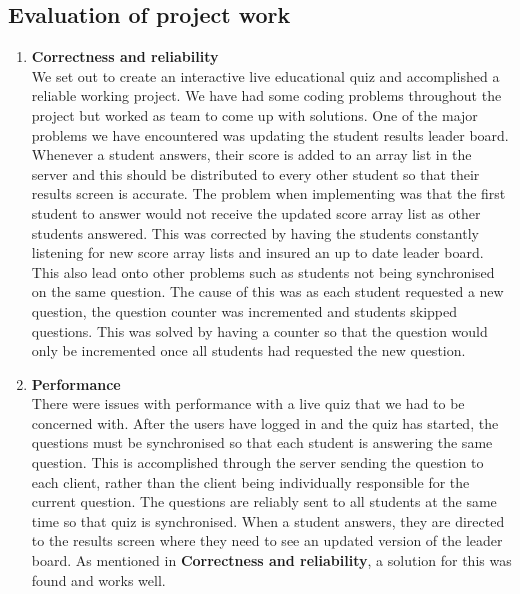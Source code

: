 \subsection{Evaluation of project work}
\label{sub:evaluation_of_project_work}

\begin{enumerate}

	\item \textbf{Correctness and reliability} \\
		We set out to create an interactive live educational quiz and accomplished a
		reliable working project. We have had some coding problems throughout the 
		project but worked as team to come up with solutions. One of the major problems 
		we have encountered was updating the student results leader board. Whenever
		a student answers, their score is added	to an array list in the server and this
		should be distributed to every other student so that their results screen is
		accurate. The problem when implementing was that the first student to answer
		would not receive the updated score array list as other students answered.
		This was corrected by having the students constantly listening for new score
		array lists and insured an up to date leader board. This also lead onto other
		problems such as students not being synchronised on the same question. The cause
		of this was as each student requested a new question, the question counter was
		incremented and students skipped questions. This was solved by having a counter
		so that the question would only be incremented once all students had requested the
		new question.
	
	\item \textbf{Performance} \\
		There were issues with performance with a live quiz that we had to be concerned with.
		After the users have logged in and the quiz has started, the questions must be 
		synchronised so that each student is answering the same question. This is accomplished 
		through the server sending the question to each client, rather than the client being 
		individually responsible for the current question. The questions are reliably sent to all 
		students at the same time so that quiz is synchronised. When a student answers, they are 
		directed to the results screen where they need to see an updated version of the leader board. 
		As mentioned in \textbf{Correctness and reliability}, a solution for this was found and works well.


\end{enumerate}
